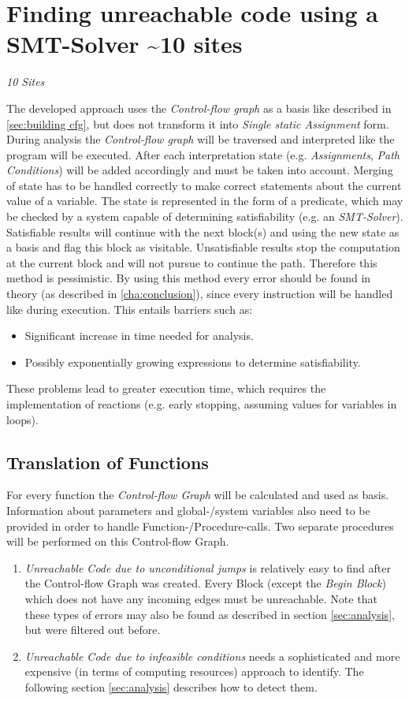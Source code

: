 
\chapter{Finding unreachable code using a SMT-Solver \textasciitilde 10 sites}
\label{cha:finding unreachable code using a smt-solver}
\emph{10 Sites}

The developed approach uses the \emph{Control-flow graph} as a basis like described in \ref{sec:building cfg}, but does not transform it into \emph{Single static Assignment} form.
During analysis the \emph{Control-flow graph} will be traversed and interpreted like the program will be executed.
After each interpretation state (e.g. \emph{Assignments}, \emph{Path Conditions}) will be added accordingly and must be taken into account.
Merging of state has to be handled correctly to make correct statements about the current value of a variable.
The state is represented in the form of a predicate, which may be checked by a system capable of determining satisfiability (e.g. an \emph{SMT-Solver}).
Satisfiable results will continue with the next block(s) and using the new state as a basis and flag this block as visitable.
Unsatisfiable results stop the computation at the current block and will not pursue to continue the path.
Therefore this method is pessimistic.
By using this method every error should be found in theory (as described in \ref{cha:conclusion}), since every instruction will be handled like during execution. 
This entails barriers such as: 
\begin{itemize}
	\item Significant increase in time needed for analysis. 
	\item Possibly exponentially growing expressions to determine satisfiability.
\end{itemize}
These problems lead to greater execution time, which requires the implementation of reactions (e.g. early stopping, assuming values for variables in loops).


\section{Translation of Functions}
\label{sec:translation}
For every function the \emph{Control-flow Graph} will be calculated and used as basis. Information about parameters and global-/system variables also need to be provided in order to handle Function-/Procedure-calls. 
Two separate procedures will be performed on this Control-flow Graph.
\begin{enumerate}
	\item \emph{Unreachable Code due to unconditional jumps} is relatively easy to find after the Control-flow Graph was created. Every Block (except the \emph{Begin Block}) which does not have any incoming edges must be unreachable.
		Note that these types of errors may also be found as described in section \ref{sec:analysis}, but were filtered out before.
	\item \emph{Unreachable Code due to infeasible conditions} needs a sophisticated and more expensive (in terms of computing resources) approach to identify. The following section \ref{sec:analysis} describes how to detect them.
\end{enumerate}
